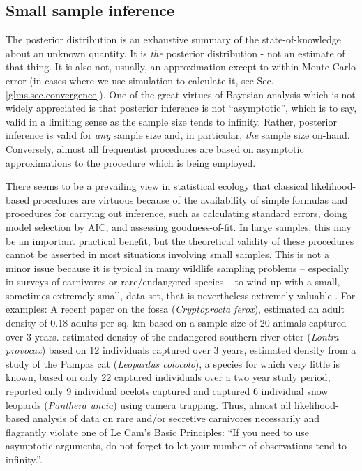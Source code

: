 \subsection{Small sample inference}

The posterior distribution is an exhaustive summary of the
state-of-knowledge about an unknown quantity. It is {\it the}
posterior distribution - not an estimate of that thing. It is also
not, usually, an approximation except to within Monte Carlo error (in
cases where we use simulation to calculate it, see
Sec. \ref{glms.sec.convergence}).  One of the great virtues of
Bayesian analysis which is not widely appreciated is that posterior
inference is not ``asymptotic'', which is to say, valid in a limiting
sense as the sample size tends to infinity. Rather, posterior
inference is valid for {\it any} sample size and, in particular, {\it
  the} sample size on-hand.  Conversely, almost all frequentist
procedures are based on asymptotic approximations to the procedure
which is being employed.

There seems to be a prevailing view in statistical ecology that
classical likelihood-based procedures are virtuous because of the
availability of simple formulas and procedures for carrying out
inference, such as calculating standard errors, doing model selection
by AIC, and assessing goodness-of-fit.  In large samples, this may be
an important practical benefit, but the theoretical validity of these
procedures cannot be asserted in most situations involving small
samples.  This is not a minor issue because it is typical in many
wildlife sampling problems -- especially in surveys of carnivores or
rare/endangered species -- to wind up with a small, sometimes extremely
small, data set, that is nevertheless extremely valuable
\citep{foster_harmsen:2012}. For examples: A recent paper
 \citep{hawkins_racey:2005}
 on the fossa
(\emph{Cryptoprocta ferox}), estimated
an adult density of 0.18 adults per sq. km based on a sample size of 20 animals captured
over 3 years. 
\citet{sepulveda_etal:2007}
 estimated density of the 
endangered southern river otter (\emph{Lontra provocax})
based on 12 individuals captured over 3
years,  
 \citet{gardner_etal:2010ecol} estimated 
density from a study of the Pampas cat (\emph {Leopardus colocolo}), a species for which very little
is known, based on only 22 captured individuals over 
a two year study period,   \citet{trolle_kery:2005} reported only 9 individual
ocelots captured and \citet{jackson_etal:2006} captured 6 individual
snow leopards (\emph{Panthera uncia}) using camera trapping. 
Thus, almost all likelihood-based
analysis of data on rare and/or
secretive carnivores necessarily and flagrantly violate one of Le
Cam's Basic Principles: ``If you need to use asymptotic
arguments, do not forget to let your number of observations tend to
infinity.''\citep{lecam:1990}.

